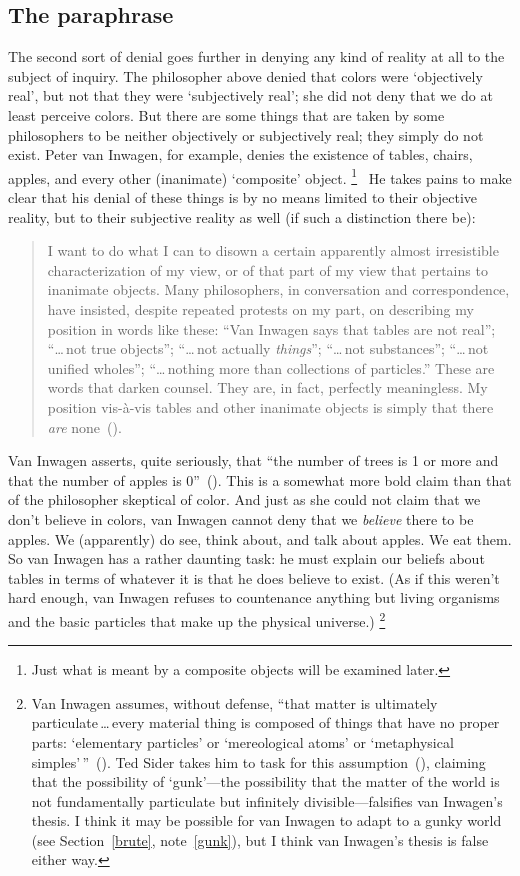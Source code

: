 \documentclass[11pt]{article}
\newenvironment{squote}{\begin{quote}\begin{singlespace}}{\end{singlespace}\end{quote}}
\begin{document}
\begin{spacing}{1.5}
\subsection{The paraphrase}
\label{paraphrase}
The second sort of denial goes further in denying any kind of reality at all to the subject of inquiry. The philosopher above denied that colors were `objectively real', but not that they were `subjectively real'; she did not deny that we do at least perceive colors. But there are some things that are taken by some philosophers to be neither objectively or subjectively real; they simply do not exist. Peter van Inwagen, for example, denies the existence of tables, chairs, apples, and every other (inanimate) `composite' object.%
%
\footnote{Just what is meant by a composite objects will be examined later.}
%
\ He takes pains to make clear that his denial of these things is by no means limited to their objective reality, but to their subjective reality as well (if such a distinction there be):
\begin{squote}
I want to do what I can to disown a certain apparently almost irresistible characterization of my view, or of that part of my view that pertains to inanimate objects. Many philosophers, in conversation and correspondence, have insisted, despite repeated protests on my part, on describing my position in words like these: ``Van Inwagen says that tables are not real''; ``\ldots\,not true objects''; ``\ldots\,not actually {\em things}''; ``\ldots\,not substances''; ``\ldots\,not unified wholes''; ``\ldots\,nothing more than collections of particles.'' These are words that darken counsel. They are, in fact, perfectly meaningless. My position vis-\`{a}-vis tables and other inanimate objects is simply that there {\em are} none~(\citeyear[99]{inwagen1995}).
\end{squote}
Van Inwagen asserts, quite seriously, that ``the number of trees is 1 or more and that the number of apples is 0''~(\citeyear[711]{inwagen1993b}). This is a somewhat more bold claim than that of the philosopher skeptical of color. And just as she could not claim that we don't believe in colors, van Inwagen cannot deny that we {\em believe} there to be apples. We (apparently) do see, think about, and talk about apples. We eat them. So van Inwagen has a rather daunting task: he must explain our beliefs about tables in terms of whatever it is that he does believe to exist. (As if this weren't hard enough, van Inwagen refuses to countenance anything but living organisms and the basic particles that make up the physical universe.)%
%
\footnote{Van Inwagen assumes, without defense, ``that matter is ultimately particulate\,\ldots\,every material thing is composed of things that have no proper parts: `elementary particles' or `mereological atoms' or `metaphysical simples'\,''~(\citeyear[5]{inwagen1995}). Ted Sider takes him to task for this assumption~(\citeyear{sider1993}), claiming that the possibility of `gunk'---the possibility that the matter of the world is not fundamentally particulate but infinitely divisible---falsifies van Inwagen's thesis. I think it may be possible for van Inwagen to adapt to a gunky world (see Section~\ref{brute}, note~\ref{gunk}), but I think van Inwagen's thesis is false either way.}
%


\end{spacing}
\end{document}
